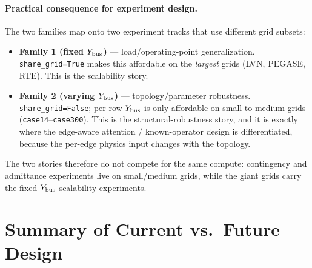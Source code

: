 \documentclass{article}
\begin{document}
\paragraph{Practical consequence for experiment design.}
The two families map onto two experiment tracks that use different grid subsets:
\begin{itemize}[noitemsep]
  \item \textbf{Family 1 (fixed $Y_{\rm bus}$)} --- load/operating-point
        generalization. \texttt{share\_grid=True} makes this affordable on the
        \emph{largest} grids (LVN, PEGASE, RTE). This is the scalability story.
  \item \textbf{Family 2 (varying $Y_{\rm bus}$)} --- topology/parameter
        robustness. \texttt{share\_grid=False}; per-row $Y_{\rm bus}$ is only
        affordable on small-to-medium grids (\texttt{case14}--\texttt{case300}).
        This is the structural-robustness story, and it is exactly where the
        edge-aware attention / known-operator design is differentiated, because
        the per-edge physics input changes with the topology.
\end{itemize}
The two stories therefore do not compete for the same compute: contingency and
admittance experiments live on small/medium grids, while the giant grids carry
the fixed-$Y_{\rm bus}$ scalability experiments.

\section{Summary of Current vs.\ Future Design}
\end{document}
